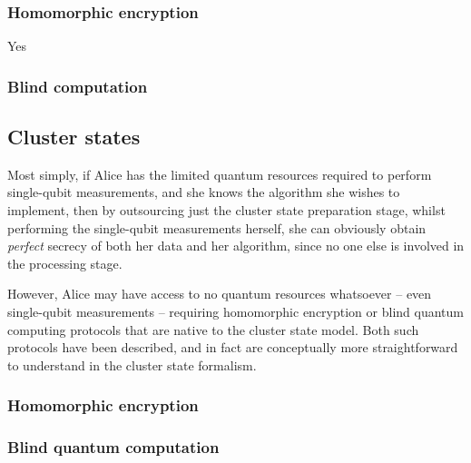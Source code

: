 %
%

\subsubsection{Homomorphic encryption} 

Yes
%
%

\subsubsection{Blind computation} 


%
%

\subsection{Cluster states} 

Most simply, if Alice has the limited quantum resources required to perform single-qubit measurements, and she knows the algorithm she wishes to implement, then by outsourcing just the cluster state preparation stage, whilst performing the single-qubit measurements herself, she can obviously obtain \textit{perfect} secrecy of both her data and her algorithm, since no one else is involved in the processing stage.

However, Alice may have access to no quantum resources whatsoever -- even single-qubit measurements -- requiring homomorphic encryption or blind quantum computing protocols that are native to the cluster state model. Both such protocols have been described, and in fact are conceptually more straightforward to understand in the cluster state formalism. 



%
%

\subsubsection{Homomorphic encryption} 


%
%

\subsubsection{Blind quantum computation} 

